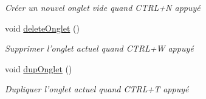 \begin{DoxyCompactItemize}
\begin{DoxyCompactList}\small\item\em Créer un nouvel onglet vide quand C\-T\-R\-L+\-N appuyé \end{DoxyCompactList}\item 
\hypertarget{class_onglet_a76074598b99789f3b17d2bf99418aeda}{void \hyperlink{class_onglet_a76074598b99789f3b17d2bf99418aeda}{delete\-Onglet} ()}\label{class_onglet_a76074598b99789f3b17d2bf99418aeda}

\begin{DoxyCompactList}\small\item\em Supprimer l'onglet actuel quand C\-T\-R\-L+\-W appuyé \end{DoxyCompactList}\item 
\hypertarget{class_onglet_a3f366c3138661e79f0656ed5eb668055}{void \hyperlink{class_onglet_a3f366c3138661e79f0656ed5eb668055}{dup\-Onglet} ()}\label{class_onglet_a3f366c3138661e79f0656ed5eb668055}

\begin{DoxyCompactList}\small\item\em Dupliquer l'onglet actuel quand C\-T\-R\-L+\-T appuyé \end{DoxyCompactList}\end{DoxyCompactItemize}
